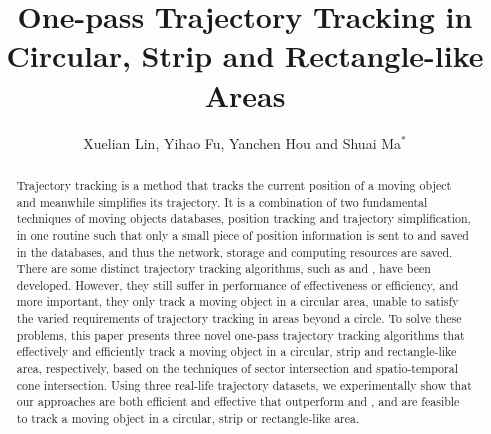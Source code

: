 \documentclass[sigconf]{acmart}
\newcommand{\ldrh}{\kw{LDRH}}
\newcommand{\grts}{\kw{GRTS}}
\begin{document}
\title{One-pass Trajectory Tracking in Circular, Strip and Rectangle-like Areas}



 \author{Xuelian Lin, Yihao Fu, Yanchen Hou and Shuai Ma$^*$}






\renewcommand{\shortauthors}{XXX et al.}


\begin{abstract}
Trajectory tracking is a method that tracks the current position of a moving object and meanwhile simplifies its trajectory. It is a combination of two fundamental techniques of moving objects databases, position tracking and trajectory simplification, in one routine such that only a small piece of position information is sent to and saved in the databases, and thus the network, storage and computing resources are saved.
%
There are some distinct trajectory tracking algorithms, such as \ldrh and \grts, have been developed. However, they still suffer in performance of effectiveness or efficiency, and more important, they only track a moving object in a circular area, unable to satisfy the varied requirements of trajectory tracking in areas beyond a circle. 
%
To solve these problems, this paper presents three novel one-pass trajectory tracking algorithms that effectively and efficiently track a moving object in a circular, strip and rectangle-like area, respectively, based on the techniques of sector intersection and spatio-temporal cone intersection.
%
Using three real-life trajectory datasets, we experimentally show that our approaches are both efficient and effective that outperform \ldrh and \grts, and are feasible to track a moving object in a circular, strip or rectangle-like area.
\end{abstract}
\end{document}

